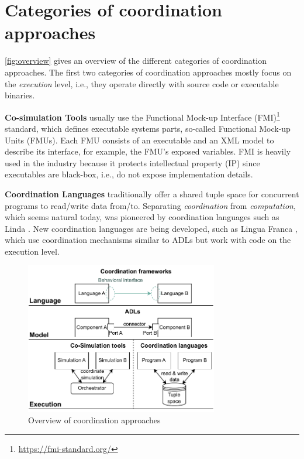 \documentclass[runningheads]{llncs}
\begin{document}
\section{Categories of coordination approaches} \label{sec:approaches}

\autoref{fig:overview} gives an overview of the different categories of coordination approaches.
The first two categories of coordination approaches mostly focus on the \textit{execution} level, i.e., they operate directly with source code or executable binaries.

\textbf{Co-simulation Tools} usually use the Functional Mock-up Interface (FMI)\footnote{\url{https://fmi-standard.org/}} standard, which defines executable systems parts, so-called Functional Mock-up Units (FMUs).
Each FMU consists of an executable and an XML model to describe its interface, for example, the FMU's exposed variables.
FMI is heavily used in the industry because it protects intellectual property (IP) since executables are black-box, i.e., do not expose implementation details.

\textbf{Coordination Languages} traditionally offer a shared tuple space for concurrent programs to read/write data from/to.
Separating \textit{coordination} from \textit{computation}, which seems natural today, was pioneered by coordination languages such as Linda \cite{carrieroLindaContext1989}.
New coordination languages are being developed, such as Lingua Franca \cite{lohstrohReactorsDeterministicModel2020}, which use coordination mechanisms similar to ADLs but work with code on the execution level.

\begin{figure}[ht]
	\centering
	\includegraphics[width=0.75\textwidth]{images/overview}
	\caption{Overview of coordination approaches}
	\label{fig:overview}
\end{figure}
\end{document}
